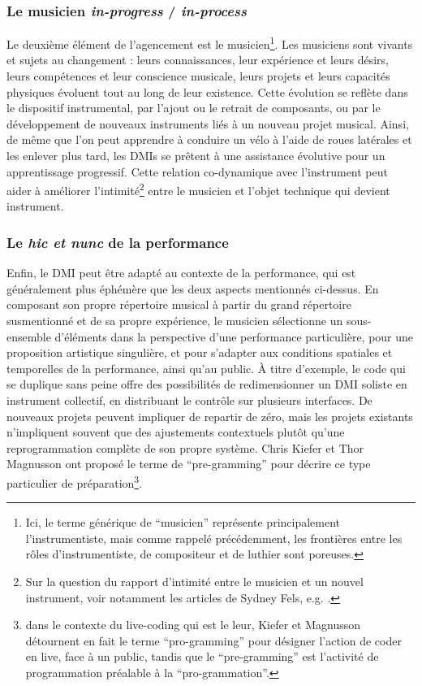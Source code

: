 \subsubsection{Le musicien \textit{in-progress} / \textit{in-process}}

\noindent Le deuxième élément de l'agencement est le musicien\footnote{Ici, le terme générique de ``musicien'' représente principalement l'instrumentiste, mais comme rappelé précédemment, les frontières entre les rôles d'instrumentiste, de compositeur et de luthier sont poreuses.}. Les musiciens sont vivants et sujets au changement : leurs connaissances, leur expérience et leurs désirs, leurs compétences et leur conscience musicale, leurs projets et leurs capacités physiques évoluent tout au long de leur existence. Cette évolution se reflète dans le dispositif instrumental, par l'ajout ou le retrait de composants, ou par le développement de nouveaux instruments liés à un nouveau projet musical. Ainsi, de même que l'on peut apprendre à conduire un vélo à l'aide de roues latérales et les enlever plus tard, les \glspl{DMI} se prêtent à une assistance évolutive pour un apprentissage progressif. Cette relation co-dynamique avec l'instrument peut aider à améliorer l'intimité\footnote{Sur la question du rapport d'intimité entre le musicien et un nouvel instrument, voir notamment les articles de Sydney Fels, e.g. \cite{fels_designing_2004}.} entre le musicien et l'objet technique qui devient instrument.

\subsubsection{Le \textit{hic et nunc} de la performance}

\noindent Enfin, le \gls{DMI} peut être adapté au contexte de la performance, qui est généralement plus éphémère que les deux aspects mentionnés ci-dessus.
En composant son propre répertoire musical à partir du grand répertoire susmentionné et de sa propre expérience, le musicien sélectionne un sous-ensemble d'éléments dans la perspective d'une performance particulière, pour une proposition artistique singulière, et pour s'adapter aux conditions spatiales et temporelles de la performance, ainsi qu'au public. À titre d'exemple, le code qui se duplique sans peine offre des possibilités de redimensionner un \gls{DMI} soliste en instrument collectif, en distribuant le contrôle sur plusieurs interfaces. De nouveaux projets peuvent impliquer de repartir de zéro, mais les projets existants n'impliquent souvent que des ajustements contextuels plutôt qu'une reprogrammation complète de son propre système. Chris Kiefer et Thor Magnusson ont proposé le terme de ``pre-gramming'' \cite{kiefer_live_2019} pour décrire ce type particulier de préparation\footnote{dans le contexte du live-coding qui est le leur, Kiefer et Magnusson détournent en fait le terme ``pro-gramming'' pour désigner l'action de coder en live, face à un public, tandis que le ``pre-gramming'' est l'activité de programmation préalable à la ``pro-grammation''.}.
	

